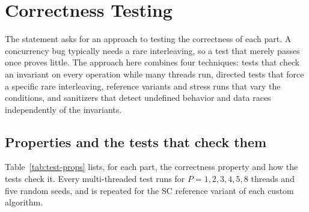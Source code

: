 \newpage
\section{Correctness Testing}\label{sec:testing}

The statement asks for an approach to testing the correctness of each part\cite{r1}. A concurrency bug typically needs a rare interleaving, so a test that merely passes once proves little. The approach here combines four techniques: tests that check an invariant on every operation while many threads run, directed tests that force a specific rare interleaving, reference variants and stress runs that vary the conditions, and sanitizers that detect undefined behavior and data races independently of the invariants.

\subsection{Properties and the tests that check them}

Table~\ref{tab:test-props} lists, for each part, the correctness property and how the tests check it. Every multi-threaded test runs for $P=1,2,3,4,5,8$ threads and five random seeds, and is repeated for the SC reference variant of each custom algorithm.

